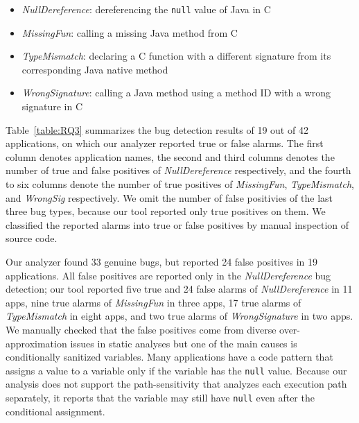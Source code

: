 \begin{itemize}
  \item {\it NullDereference}: dereferencing the {\tt null} value of Java in C
  \item {\it MissingFun}: calling a missing Java method from C
  \item {\it TypeMismatch}: declaring a C function with a different signature
    from its corresponding Java native method
  \item {\it WrongSignature}: calling a Java method using a method ID with a
    wrong signature in C
\end{itemize}

Table~\ref{table:RQ3} summarizes the bug detection results of 19 out of 42
applications, on which our analyzer reported true or false alarms.  The first
column denotes application names, the second and third columns denotes the
number of true and false positives of {\it NullDereference} respectively, and
the fourth to six columns denote the number of true positives of {\it
MissingFun}, {\it TypeMismatch}, and {\it WrongSig} respectively. We omit the
number of false positivies of the last three bug types, because our tool
reported only true positives on them. We classified the reported alarms into
true or false positives by manual inspection of source code. 


Our analyzer found 33 genuine bugs, but reported 24 false positives in 19
applications. All false positives are reported only in the {\it
NullDereference} bug detection; our tool reported five true and 24 false alarms
of {\it NullDereference} in 11 apps, nine true alarms of {\it MissingFun} in
three apps, 17 true alarms of {\it TypeMismatch} in eight apps, and two true
alarms of {\it WrongSignature} in two apps. We manually checked that the false
positives come from diverse over-approximation issues in static analyses but
one of the main causes is conditionally sanitized variables.  Many applications
have a code pattern that assigns a value to a variable only if the variable has
the {\tt null} value. Because our analysis does not support the
path-sensitivity that analyzes each execution path separately, it reports that
the variable may still have {\tt null} even after the conditional assignment. 



